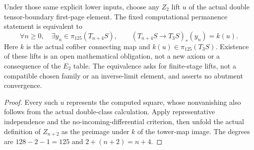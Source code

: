 \begin{proposition}
  \label{prop:h6-computed-double-tower-lifts}
  \notready
  Under those same explicit lower inputs, choose any $Z_2$ lift $u$ of the
  actual double tensor-boundary first-page element. The fixed computational
  permanence statement is equivalent to
  \[
    \forall n\ge0,\quad \exists y_n\in\pi_{125}(T_{n+4}S),\qquad
    (T_{n+4}S\longrightarrow T_3S)_*(y_n)=k(u).
  \]
  Here $k$ is the actual cofiber connecting map and
  $k(u)\in\pi_{125}(T_3S)$. Existence of these lifts is an open mathematical
  obligation, not a new axiom or a consequence of the $E_2$ table. The
  equivalence asks for finite-stage lifts, not a compatible chosen family
  or an inverse-limit element, and asserts no abutment convergence.
\end{proposition}
\begin{proof}
  Every such $u$ represents the computed square, whose nonvanishing also
  follows from the actual double-class calculation. Apply representative
  independence and the no-incoming-differential criterion, then unfold the
  actual definition of $Z_{n+2}$ as the preimage under $k$ of the tower-map
  image. The degrees are $128-2-1=125$ and $2+(n+2)=n+4$.
\end{proof}

